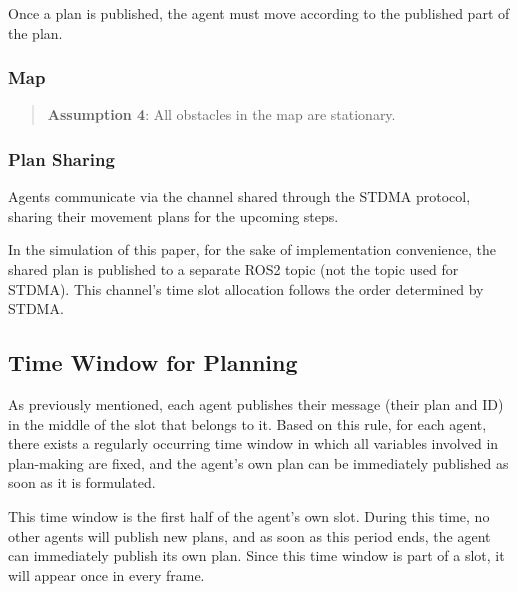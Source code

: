 Once a plan is published, the agent must move according to the published part of the plan.

\subsubsection{Map}
\begin{quotation}
    \textbf{Assumption 4}:
    All obstacles in the map are stationary.
\end{quotation}

\subsubsection{Plan Sharing}

Agents communicate via the channel shared through the STDMA protocol, sharing their movement plans for the upcoming steps.

In the simulation of this paper, for the sake of implementation convenience, the shared plan is published to a separate ROS2 topic (not the topic used for STDMA). This channel's time slot allocation follows the order determined by STDMA.


\subsection{Time Window for Planning}

As previously mentioned, each agent publishes their message (their plan and ID) in the middle of the slot that belongs to it.
Based on this rule, for each agent, there exists a regularly occurring time window 
in which all variables involved in plan-making are fixed, and the agent's own plan can be immediately published as soon as it is formulated.

This time window is the first half of the agent's own slot. During this time, no other agents will publish new plans, and as soon as this period ends, the agent can immediately publish its own plan.
Since this time window is part of a slot, it will appear once in every frame.

